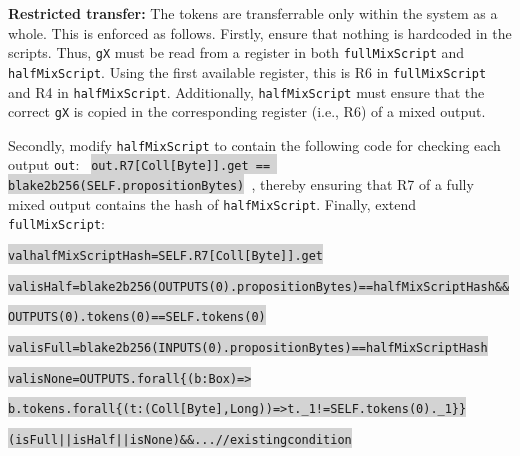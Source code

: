 \documentclass[11pt]{article}
\newcommand\Hi[2][lightgray]{%
	\hspace*{-\fboxsep}%
	\colorbox{#1}{#2}%
	\hspace*{-\fboxsep}%
}
\begin{document}
\textbf{Restricted transfer:} The tokens are transferrable only within the system as a whole. %
This is enforced as follows. 
Firstly, ensure that nothing is hardcoded in the scripts. Thus, \texttt{gX} must be read from a register in both \texttt{fullMixScript} and \texttt{halfMixScript}. Using the first available register, this is R6 in \texttt{fullMixScript} and R4 in \texttt{halfMixScript}. Additionally, \texttt{halfMixScript} must ensure that the correct \texttt{gX} is copied in the corresponding register (i.e., R6) of a mixed output. 

Secondly, modify \texttt{halfMixScript} to contain the following code for checking each output \texttt{out}: 
\texttt{\Hi{out.R7[Coll[Byte]].get == blake2b256(SELF.propositionBytes)}}, thereby ensuring that R7 of a fully mixed output contains the hash of \texttt{halfMixScript}. Finally, extend \texttt{fullMixScript}:

\begin{alltt}
\Hi{val halfMixScriptHash = SELF.R7[Coll[Byte]].get} 
\Hi{val isHalf = blake2b256(OUTPUTS(0).propositionBytes) == halfMixScriptHash &&}
             \Hi{OUTPUTS(0).tokens(0) == SELF.tokens(0)}
\Hi{val isFull = blake2b256(INPUTS(0).propositionBytes) == halfMixScriptHash} 
\Hi{val isNone = OUTPUTS.forall\{(b:Box) => }
  \Hi{b.tokens.forall\{(t:(Coll[Byte], Long)) => t._1 != SELF.tokens(0)._1\}\}} 
\Hi{(isFull || isHalf || isNone) && ... // existing condition} 
\end{alltt}


\end{document}
